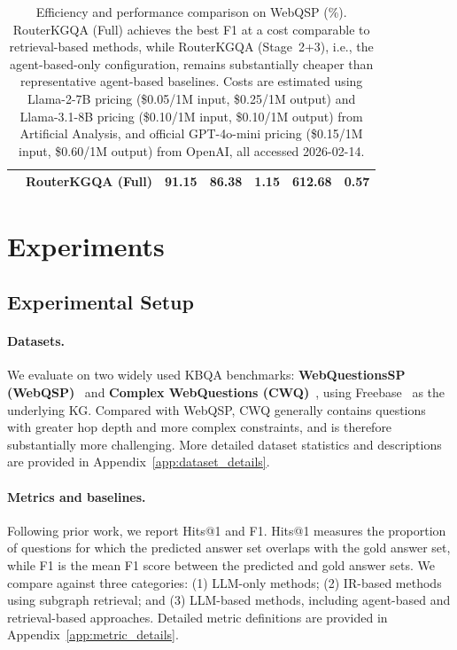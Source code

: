 \documentclass[11pt]{article}
\begin{document}
\begin{table}[t]
{\begin{tabular}{llccccc}
& RouterKGQA (Full) & 91.15 & \textbf{86.38} & 1.15 & 612.68 & 0.57 \\
\bottomrule
\end{tabular}
}
\caption{Efficiency and performance comparison on WebQSP (\%). RouterKGQA (Full) achieves the best F1 at a cost comparable to retrieval-based methods, while RouterKGQA (Stage~2+3), i.e., the agent-based-only configuration, remains substantially cheaper than representative agent-based baselines. Costs are estimated using Llama-2-7B pricing (\$0.05/1M input, \$0.25/1M output) and Llama-3.1-8B pricing (\$0.10/1M input, \$0.10/1M output) from Artificial Analysis, and official GPT-4o-mini pricing (\$0.15/1M input, \$0.60/1M output) from OpenAI, all accessed 2026-02-14.}
\label{tab:efficiency_webqsp}
\end{table}


\section{Experiments}
\label{sec:experiments}

\subsection{Experimental Setup}
\label{sec:exp_setup}

\paragraph{Datasets.}
We evaluate on two widely used KBQA benchmarks: \textbf{WebQuestionsSP (WebQSP)}~\citep{yih-etal-2016-value} and \textbf{Complex WebQuestions (CWQ)}~\citep{talmor-berant-2018-web}, using Freebase~\citep{bollacker2008freebase} as the underlying KG. Compared with WebQSP, CWQ generally contains questions with greater hop depth and more complex constraints, and is therefore substantially more challenging. More detailed dataset statistics and descriptions are provided in Appendix~\ref{app:dataset_details}.

\paragraph{Metrics and baselines.}
Following prior work, we report Hits@1 and F1. Hits@1 measures the proportion of questions for which the predicted answer set overlaps with the gold answer set, while F1 is the mean F1 score between the predicted and gold answer sets. We compare against three categories: (1) LLM-only methods; (2) IR-based methods using subgraph retrieval; and (3) LLM-based methods, including agent-based and retrieval-based approaches. Detailed metric definitions are provided in Appendix~\ref{app:metric_details}.
\end{document}
